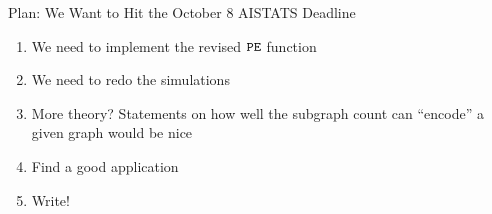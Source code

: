 \documentclass[newPxFont,numfooter,sectionpages]{beamer}
\newcommand{\btheta}{\boldsymbol{\phi}}
\begin{document}
\begin{frame}{Plan: We Want to Hit the October 8 AISTATS Deadline}
\begin{enumerate}
  \item We need to implement the revised $\tt PE$ function
  \item We need to redo the simulations
  \item More theory? Statements on how well the subgraph count can ``encode'' a given graph would be nice
  \item Find a good application
  \item Write!
\end{enumerate}
\end{frame}
\end{document}
